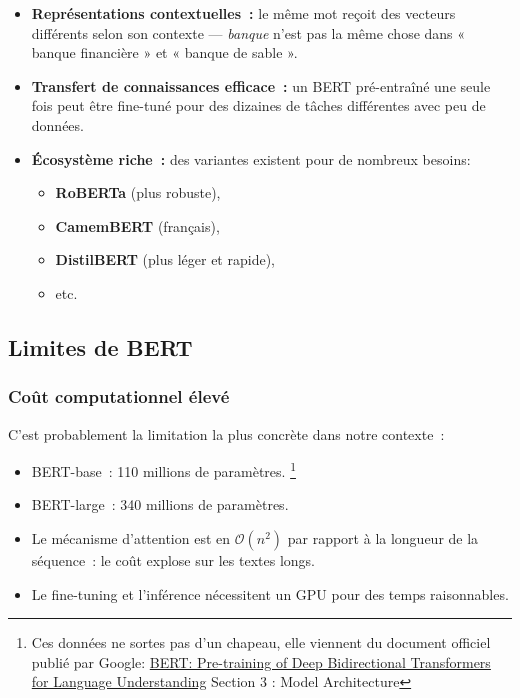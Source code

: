 \documentclass[12pt,a4paper]{article}
\begin{document}
\begin{itemize}[leftmargin=1.5cm]
  \item \textbf{Représentations contextuelles~:} le même mot reçoit des vecteurs
    différents selon son contexte — \textit{banque} n'est pas la même chose dans
    « banque financière » et « banque de sable ».
  \item \textbf{Transfert de connaissances efficace~:} un BERT pré-entraîné une seule
    fois peut être fine-tuné pour des dizaines de tâches différentes avec peu de données.
  \item \textbf{Écosystème riche~:} des variantes existent pour de nombreux besoins:
  \begin{itemize}[leftmargin=1.5cm]
    \item \textbf{RoBERTa} (plus robuste), 
    \item \textbf{CamemBERT} (français),
    \item \textbf{DistilBERT} (plus léger et rapide), 
    \item etc. 
  \end{itemize}
\end{itemize}

\subsection{Limites de BERT}

\subsubsection{Coût computationnel élevé}

C'est probablement la limitation la plus concrète dans notre contexte~:

\begin{itemize}[leftmargin=1.5cm]
  \item BERT-base~: 110 millions de paramètres. \footnote[1]{Ces données ne sortes pas d'un chapeau, elle viennent du document officiel publié par Google: \href{https://arxiv.org/abs/1810.04805}{BERT: Pre-training of Deep Bidirectional Transformers for Language Understanding} Section 3 : Model Architecture}
  \item BERT-large~: 340 millions de paramètres.
  \item Le mécanisme d'attention est en $\mathcal{O}(n^2)$ par rapport à la longueur
    de la séquence~: le coût explose sur les textes longs.
  \item Le fine-tuning et l'inférence nécessitent un GPU pour des temps raisonnables.
\end{itemize}
\end{document}

